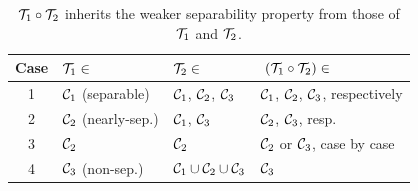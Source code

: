 
\begin{table}
\begin{center}
\begin{tabular}{c|l|l|l}
\hline
Case & ${\mathcal{T}}_1\in$ & ${\mathcal{T}}_2\in$ & $~({\mathcal{T}}_1\circ{\mathcal{T}}_2)\in ~$\\\hline\hline
1 & ${\mathcal{C}}_1$ (separable) & ${\mathcal{C}}_1$, ${\mathcal{C}}_2$, ${\mathcal{C}}_3$ & ${\mathcal{C}}_1$, ${\mathcal{C}}_2$, ${\mathcal{C}}_3$, respectively \\\hline
2 & ${\mathcal{C}}_2$ (nearly-sep.)& ${\mathcal{C}}_1$, ${\mathcal{C}}_3$ & ${\mathcal{C}}_2$, ${\mathcal{C}}_3$, resp. \\\hline
3 & ${\mathcal{C}}_2$ & ${\mathcal{C}}_2$ & ${\mathcal{C}}_2$ or ${\mathcal{C}}_3$, case by case \\\hline
4 & ${\mathcal{C}}_3$ (non-sep.) & ${\mathcal{C}}_1\cup{\mathcal{C}}_2\cup{\mathcal{C}}_3$ & ${\mathcal{C}}_3$ \\\hline
\end{tabular}\end{center}
\caption{${\mathcal{T}}_1\circ{\mathcal{T}}_2$ inherits the weaker separability property from those of ${\mathcal{T}}_1$ and ${\mathcal{T}}_2$.}\label{table:comp1-op}\end{table}



